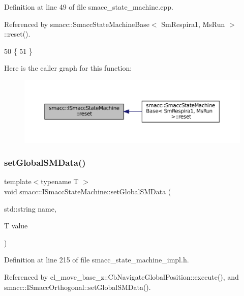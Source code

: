 Definition at line 49 of file smacc\+\_\+state\+\_\+machine.\+cpp.



Referenced by smacc\+::\+Smacc\+State\+Machine\+Base$<$ Sm\+Respira1, Ms\+Run $>$\+::reset().


\begin{DoxyCode}
50 \{
51 \}
\end{DoxyCode}
Here is the caller graph for this function\+:
\nopagebreak
\begin{figure}[H]
\begin{center}
\leavevmode
\includegraphics[width=350pt]{classsmacc_1_1ISmaccStateMachine_a9e4b4fe4dda962642397993235c6eea0_icgraph}
\end{center}
\end{figure}
\mbox{\label{classsmacc_1_1ISmaccStateMachine_a8588f9e580fbb95b53e2bd2ca3ff1f98}} 
\subsubsection{\texorpdfstring{set\+Global\+S\+M\+Data()}{setGlobalSMData()}}
{\footnotesize\ttfamily template$<$typename T $>$ \\
void smacc\+::\+I\+Smacc\+State\+Machine\+::set\+Global\+S\+M\+Data (\begin{DoxyParamCaption}\item[{std\+::string}]{name,  }\item[{T}]{value }\end{DoxyParamCaption})}



Definition at line 215 of file smacc\+\_\+state\+\_\+machine\+\_\+impl.\+h.



Referenced by cl\+\_\+move\+\_\+base\+\_\+z\+::\+Cb\+Navigate\+Global\+Position\+::execute(), and smacc\+::\+I\+Smacc\+Orthogonal\+::set\+Global\+S\+M\+Data().


